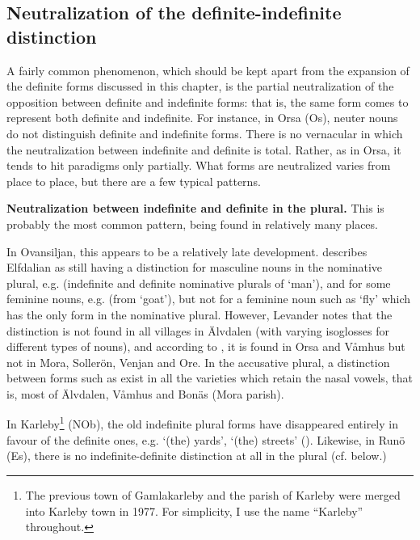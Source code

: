 \subsection{ Neutralization of the definite-indefinite distinction}
\label{bkm:Ref114304507}

A fairly common phenomenon, which should be kept apart from the expansion of the definite forms discussed in this chapter, is the partial neutralization of the opposition between definite and indefinite forms: that is, the same form comes to represent both definite and indefinite. For instance, in Orsa (Os), neuter nouns do not distinguish definite and indefinite forms. There is no vernacular in which the neutralization between indefinite and definite is total. Rather, as in Orsa, it tends to hit paradigms only partially. What forms are neutralized varies from place to place, but there are a few typical patterns.

\textbf{Neutralization between indefinite and definite in the plural.} This is probably the most common pattern, being found in relatively many places. 

In Ovansiljan, this appears to be a relatively late development. \citet{Levander1909} describes Elfdalian as still having a distinction for masculine nouns in the nominative plural, e.g. (indefinite and definite nominative plurals of ‘man’), and for some feminine nouns, e.g.  (from  ‘goat’), but not for a feminine noun such as ‘fly’ which has the only form  in the nominative plural. However, Levander notes that the distinction is not found in all villages in Älvdalen (with varying isoglosses for different types of nouns), and according to \citet[170]{Levander1928}, it is found in Orsa and Våmhus but not in Mora, Sollerön, Venjan and Ore. In the accusative plural, a distinction between forms such as exist in all the varieties which retain the nasal vowels, that is, most of Älvdalen, Våmhus and Bonäs (Mora parish). 

In Karleby\footnote{ The previous town of Gamlakarleby and the parish of Karleby were merged into Karleby town in 1977. For simplicity, I use the name “Karleby” throughout. } (NOb), the old indefinite plural forms have disappeared entirely in favour of the definite ones, e.g.  ‘(the) yards’,  ‘(the) streets’ (\citet[93]{Hagfors1891}). Likewise, in Runö (Es), there is no indefinite-definite distinction at all in the plural (cf.  below.)

